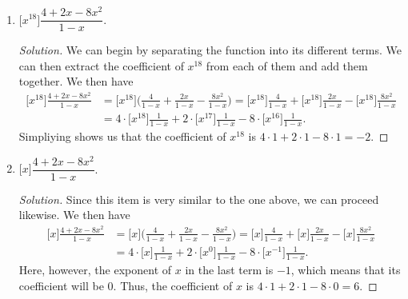 \documentclass{article}
\newenvironment{solution}
  {\renewcommand\qedsymbol{$\blacksquare$}\begin{proof}[Solution]}
  {\end{proof}}
\begin{document}
\begin{enumerate}
\begin{solution}
        We can begin by factoring out $\dfrac{1}{2}$ from the function. We do this so that the denominator takes on the form of $1-ax$, where $a$ is some real number. We then have\begin{align*} 
            \big[x^8\big]\frac{1}{2+x} &= \big[x^8\big] \bigg( \frac{1}{2} \cdot \frac{1}{1+\frac{1}{2}x} \bigg) = \frac{1}{2} \cdot \big[x^8\big] \frac{1}{1+\frac{1}{2}x}. 
        \end{align*} Solving $\big[x^8\big] \dfrac{1}{1+\frac{1}{2}x} $ gives us ${\bigg(-\dfrac{1}{2}\bigg)}^8 = \dfrac{1}{256}$. We then multiply it by $\dfrac{1}{2}$ to get $\dfrac{1}{512}$. 
    \end{solution} 
    \item $\big[x^{18}\big]\dfrac{4+2x-8x^2}{1-x}$.\begin{solution}
        We can begin by separating the function into its different terms. We can then extract the coefficient of $x^{18}$ from each of them and add them together. We then have\begin{align*} 
            \big[x^{18}\big]\frac{4+2x-8x^2}{1-x} &= \big[x^{18}\big] \bigg( \frac{4}{1-x} + \frac{2x}{1-x} - \frac{8x^2}{1-x} \bigg) = \big[x^{18}\big] \frac{4}{1-x} + \big[x^{18}\big] \frac{2x}{1-x} - \big[x^{18}\big] \frac{8x^2}{1-x} \\
            &= 4 \cdot \big[x^{18}\big] \frac{1}{1-x} + 2 \cdot \big[x^{17}\big] \frac{1}{1-x} - 8 \cdot \big[x^{16}\big] \frac{1}{1-x}.
        \end{align*} Simpliying shows us that the coefficient of $x^{18}$ is $4 \cdot 1 + 2 \cdot 1 - 8 \cdot 1 = -2$. 
    \end{solution} 
    \item $\big[x\big]\dfrac{4+2x-8x^2}{1-x}$.\begin{solution}
        Since this item is very similar to the one above, we can proceed likewise. We then have\begin{align*} 
            \big[x\big]\frac{4+2x-8x^2}{1-x} &= \big[x\big] \bigg( \frac{4}{1-x} + \frac{2x}{1-x} - \frac{8x^2}{1-x} \bigg) = \big[x\big] \frac{4}{1-x} + \big[x\big] \frac{2x}{1-x} - \big[x\big] \frac{8x^2}{1-x} \\
            &= 4 \cdot \big[x\big] \frac{1}{1-x} + 2 \cdot \big[x^0\big] \frac{1}{1-x} - 8 \cdot \big[x^{-1}\big] \frac{1}{1-x}.
        \end{align*} Here, however, the exponent of $x$ in the last term is $-1$, which means that its coefficient will be 0. Thus, the coefficient of $x$ is $4\cdot 1 + 2\cdot 1 - 8\cdot0 = 6$. 

\end{solution}
\end{enumerate}
\end{document}
